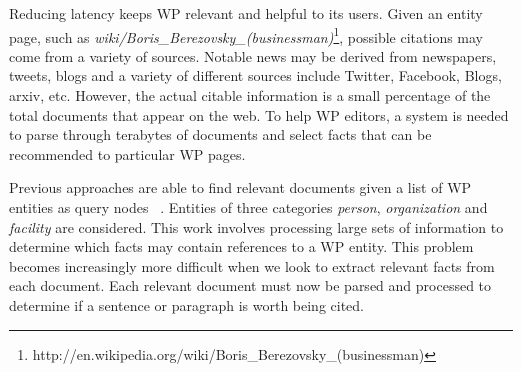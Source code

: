 \documentclass[letterpaper]{article}
\begin{document}
Reducing latency keeps WP relevant and helpful to its users.
Given an entity page, such as \textsl{wiki/Boris\_Berezovsky\_(businessman)}\footnote{http://en.wikipedia.org/wiki/Boris\_Berezovsky\_(businessman)},
possible citations may come from a variety of sources.
Notable news may be derived from newspapers, tweets, blogs and a variety of
different sources include Twitter, Facebook, Blogs, arxiv, etc.
However, the actual citable information is a small percentage of the total documents that appear on the web.
To help WP editors, a system is needed to parse through terabytes of documents 
and select facts that can be recommended to particular WP pages.


Previous approaches are able to find relevant documents given a list of WP
entities as query nodes \cite{mcnamee2012hltcoe}
 \cite{dalton2013bi}\,
\cite{Bonnefoy:2013:WDE:2484028.2484180, Balog:2013:CCR:2484028.2484151,ji2011knowledge}.
Entities of three categories \textit{person}, \textit{organization} and \textit{facility} are considered.
This work involves processing large sets of information to determine which facts may contain references to a WP entity. 
This problem becomes increasingly more difficult when we look to extract relevant facts from
each document.
Each relevant document must now be parsed and processed to determine if a sentence or paragraph is worth being cited.
\end{document}

